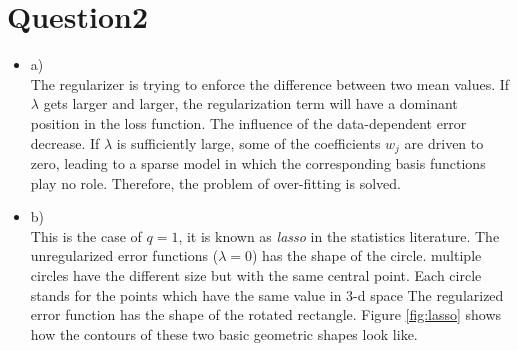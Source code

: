 \documentclass[a4paper,10pt]{article}
\begin{document}
\section{Question2}
\begin{itemize}
    \item a) \\
    The regularizer is trying to enforce the difference between two mean values. If $\lambda$ gets larger and larger, the regularization term will have a dominant position in the loss function. The influence of the data-dependent error decrease. If $\lambda$ is sufficiently large, some of the coefficients $w_j$ are driven to zero, leading to a sparse model in which the corresponding basis functions play no role. Therefore, the problem of over-fitting is solved.
    \item b) \\
    This is the case of $q=1$, it is known as \textit{lasso} in the statistics literature.
    The unregularized error functions ($\lambda = 0 $) has the shape of the circle. multiple circles have the different size but with the same central point. Each circle stands for the points which have the same value in 3-d space
    The regularized error function has the shape of the rotated rectangle. Figure \ref{fig:lasso} shows how the contours of these two basic geometric shapes look like.
        

\end{itemize}
\end{document}
